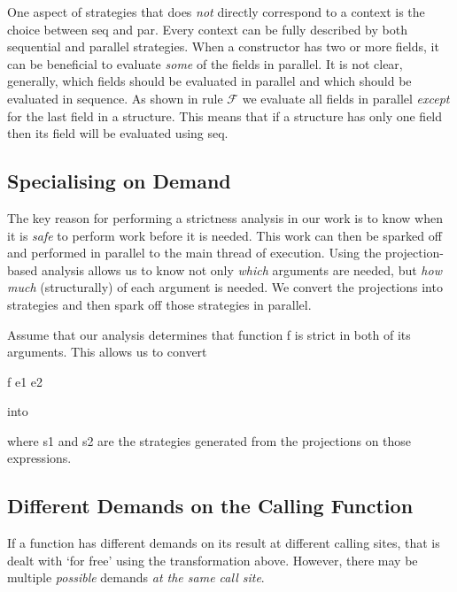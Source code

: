 One aspect of strategies that does \emph{not} directly correspond to a context
is the choice between \<seq\> and \<par\>. Every context can be fully
described by both sequential and parallel strategies. When a constructor has
two or more fields, it can be beneficial to evaluate \emph{some} of the fields
in parallel. It is not clear, generally, which fields should be evaluated in
parallel and which should be evaluated in sequence. As shown in rule $\mathcal{F}$
we evaluate all fields in parallel \emph{except} for the last field in a structure.
This means that if a structure has only one field then its field will be evaluated
using \<seq\>.

\subsection{Specialising on Demand}
\label{sec:specialiseDemand}

The key reason for performing a strictness analysis in our work is to know when
it is \emph{safe} to perform work before it is needed. This work can then be
sparked off and performed in parallel to the main thread of execution. Using
the projection-based analysis allows us to know not only \emph{which} arguments
are needed, but \emph{how much} (structurally) of each argument is needed. We
convert the projections into strategies and then spark off those strategies in
parallel.

Assume that our analysis determines that function \<f\> is strict in both of
its arguments.  This allows us to convert

\begin{haskell}
        f e1 e2
\end{haskell}

into

\begin{haskell}
\end{haskell}

where \<s1\> and \<s2\> are the strategies generated from the projections on those
expressions.


\subsection*{Different Demands on the Calling Function}

If a function has different demands on its result at different calling sites,
that is dealt with `for free' using the transformation above. However, there
may be multiple \emph{possible} demands \emph{at the same call site}.

